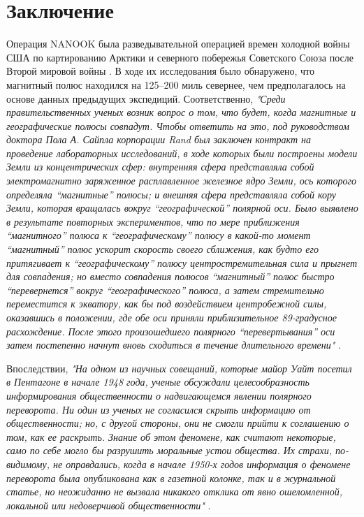 \documentclass[10pt,twocolumn,letterpaper]{article}
\begin{document}
\section{Заключение}

Операция NANOOK была разведывательной операцией времен холодной войны США по картированию Арктики и северного побережья Советского Союза после Второй мировой войны \cite{137}. В ходе их исследования было обнаружено, что магнитный полюс находился на 125–200 миль севернее, чем предполагалось на основе данных предыдущих экспедиций. Соответственно, \textit{"Среди правительственных ученых возник вопрос о том, что будет, когда магнитные и географические полюсы совпадут. Чтобы ответить на это, под руководством доктора Пола А. Сайпла корпорации Rand был заключен контракт на проведение лабораторных исследований, в ходе которых были построены модели Земли из концентрических сфер: внутренняя сфера представляла собой электромагнитно заряженное расплавленное железное ядро Земли, ось которого определяла “магнитные” полюсы; и внешняя сфера представляла собой кору Земли, которая вращалась вокруг “географической” полярной оси. Было выявлено в результате повторных экспериментов, что по мере приближения “магнитного” полюса к “географическому” полюсу в какой-то момент “магнитный” полюс ускорит скорость своего сближения, как будто его притягивает к “географическому” полюсу центростремительная сила и прыгнет для совпадения; но вместо совпадения полюсов “магнитный” полюс быстро “перевернется” вокруг “географического” полюса, а затем стремительно переместится к экватору, как бы под воздействием центробежной силы, оказавшись в положении, где обе оси приняли приблизительное 89-градусное расхождение. После этого произошедшего полярного “перевертывания” оси затем постепенно начнут вновь сходиться в течение длительного времени"} \cite{138,139}.

Впоследствии, \textit{"На одном из научных совещаний, которые майор Уайт посетил в Пентагоне в начале 1948 года, ученые обсуждали целесообразность информирования общественности о надвигающемся явлении полярного переворота. Ни один из ученых не согласился скрыть информацию от общественности; но, с другой стороны, они не смогли прийти к соглашению о том, как ее раскрыть. Знание об этом феномене, как считают некоторые, само по себе могло бы разрушить моральные устои общества. Их страхи, по-видимому, не оправдались, когда в начале 1950-х годов информация о феномене переворота была опубликована как в газетной колонке, так и в журнальной статье, но неожиданно не вызвала никакого отклика от явно ошеломленной, локальной или недоверчивой общественности"} \cite{138,139}.
\end{document}
